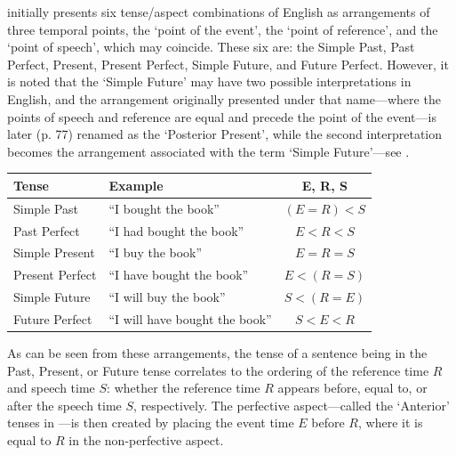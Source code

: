 \documentclass[a4paper,12pt,leqno,twoside]{article}
\begin{document}
\citet[p. 72]{reichenbach1947elements} initially presents six tense/aspect combinations of English as arrangements of three temporal points, the `point of the event', the `point of reference', and the `point of speech', which may coincide. These six are: the Simple Past, Past Perfect, Present, Present Perfect, Simple Future, and Future Perfect. However, it is noted that the `Simple Future' may have two possible interpretations in English, and the arrangement originally presented under that name---where the points of speech and reference are equal and precede the point of the event---is later (p. 77) renamed as the `Posterior Present', while the second interpretation becomes the arrangement associated with the term `Simple Future'---see .




\begin{center}
	\begin{tabular}{|l l c|}
		\hline
		\textbf{Tense} & \textbf{Example} & \textbf{E, R, S}\\
		\hline
		Simple Past & ``I bought the book'' & $(E = R) < S$\\
		Past Perfect & ``I had bought the book'' & $E < R < S$\\
		Simple Present & ``I buy the book'' & $E = R = S$\\
		Present Perfect & ``I have bought the book'' & $E < (R = S)$\\
		Simple Future & ``I will buy the book'' & $S < (R = E)$\\
		Future Perfect & ``I will have bought the book'' & $S < E < R$\\
		\hline
	\end{tabular}
	\label{fig:reichenbach-arrangements}
\end{center}
As can be seen from these arrangements, the tense of a sentence being in the Past, Present, or Future tense correlates to the ordering of the reference time $R$ and speech time $S$: whether the reference time $R$ appears before, equal to, or after the speech time $S$, respectively. The perfective aspect---called the `Anterior' tenses in \citet[p. 77]{reichenbach1947elements}---is then created by placing the event time $E$ before $R$, where it is equal to $R$ in the non-perfective aspect.
\end{document}
